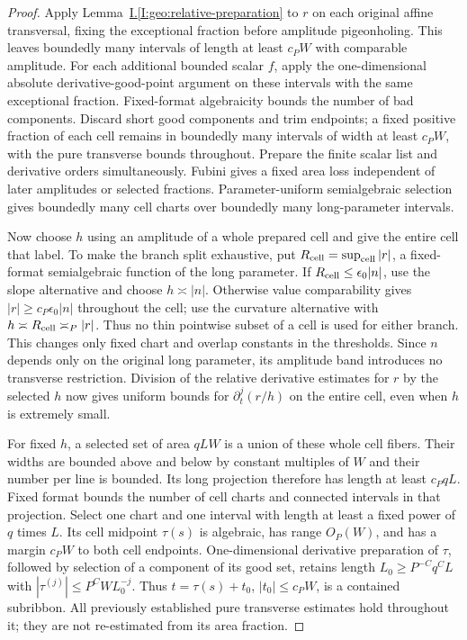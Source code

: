 \documentclass[11pt]{amsart}
\theoremstyle{definition}
\theoremstyle{remark}
\numberwithin{equation}{section}
\newcommand{\partIref}[1]{\hyperref[I:#1]{I.\ref*{I:#1}}}
\begin{document}
\begin{proof}
Apply Lemma~\partIref{geo:relative-preparation} to $r$ on each original affine transversal, fixing the exceptional fraction before amplitude pigeonholing. This leaves boundedly many intervals of length at least $c_PW$ with comparable amplitude. For each additional bounded scalar $f$, apply the one-dimensional absolute derivative-good-point argument on these intervals with the same exceptional fraction. Fixed-format algebraicity bounds the number of bad components. Discard short good components and trim endpoints; a fixed positive fraction of each cell remains in boundedly many intervals of width at least $c_PW$, with the pure transverse bounds throughout. Prepare the finite scalar list and derivative orders simultaneously. Fubini gives a fixed area loss independent of later amplitudes or selected fractions. Parameter-uniform semialgebraic selection gives boundedly many cell charts over boundedly many long-parameter intervals.

Now choose $h$ using an amplitude of a whole prepared cell and give the entire cell that label. To make the branch split exhaustive, put $R_{\rm cell}=\sup_{\rm cell}|r|$, a fixed-format semialgebraic function of the long parameter. If $R_{\rm cell}\le\epsilon_0|n|$, use the slope alternative and choose $h\asymp|n|$. Otherwise value comparability gives $|r|\ge c_P\epsilon_0|n|$ throughout the cell; use the curvature alternative with $h\asymp R_{\rm cell}\asymp_P|r|$. Thus no thin pointwise subset of a cell is used for either branch. This changes only fixed chart and overlap constants in the thresholds. Since $n$ depends only on the original long parameter, its amplitude band introduces no transverse restriction. Division of the relative derivative estimates for $r$ by the selected $h$ now gives uniform bounds for $\partial_t^j(r/h)$ on the entire cell, even when $h$ is extremely small.

For fixed $h$, a selected set of area $qLW$ is a union of these whole cell fibers. Their widths are bounded above and below by constant multiples of $W$ and their number per line is bounded. Its long projection therefore has length at least $c_PqL$. Fixed format bounds the number of cell charts and connected intervals in that projection. Select one chart and one interval with length at least a fixed power of $q$ times $L$. Its cell midpoint $\tau(s)$ is algebraic, has range $O_P(W)$, and has a margin $c_PW$ to both cell endpoints. One-dimensional derivative preparation of $\tau$, followed by selection of a component of its good set, retains length $L_0\ge P^{-C}q^CL$ with $|\tau^{(j)}|\le P^CW L_0^{-j}$. Thus $t=\tau(s)+t_0$, $|t_0|\le c_PW$, is a contained subribbon. All previously established pure transverse estimates hold throughout it; they are not re-estimated from its area fraction.


\end{proof}
\end{document}
